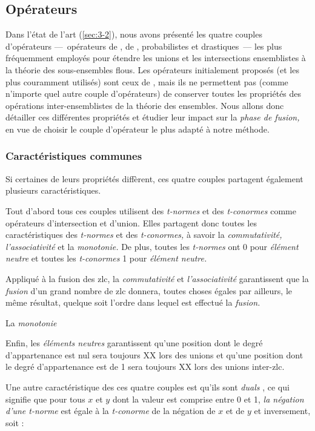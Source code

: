 \subsection{Opérateurs}

Dans l'état de l'art (\autoref{sec:3-2}), nous avons présenté les
quatre couples d'opérateurs ---~opérateurs de \textcite{Zadeh1965}, de
, probabilistes et drastiques~--- les plus
fréquemment employés pour étendre les unions et les intersections
ensemblistes à la théorie des sous-ensembles flous. Les opérateurs
initialement proposés (et les plus couramment utilisés) sont ceux de
\textcite{Zadeh1965}, mais ils ne permettent pas (comme n'importe quel
autre couple d'opérateurs) de conserver toutes les propriétés des
opérations inter-ensemblistes de la théorie des ensembles. Nous allons
donc détailler ces différentes propriétés et étudier leur impact sur
la \emph{phase de fusion,} en vue de choisir le couple d'opérateur le
plus adapté à notre méthode.

\subsubsection{Caractéristiques communes}

Si certaines de leurs propriétés diffèrent, ces quatre couples
partagent également plusieurs caractéristiques.

Tout d'abord tous ces couples utilisent des \emph{t-normes} et des
\emph{t-conormes} comme opérateurs d'intersection et d'union. Elles
partagent donc toutes les caractéristiques des \emph{t-normes} et des
\emph{t-conormes,} à savoir la \emph{commutativité,}
\emph{l'associativité} et la \emph{monotonie.} De plus, toutes les
\emph{t-normes} ont 0 pour \emph{élément neutre} et toutes les
\emph{t-conormes} 1 pour \emph{élément neutre.}

Appliqué à la fusion des \ac{zlc}, la \emph{commutativité} et
\emph{l'associativité} garantissent que la \emph{fusion} d'un grand
nombre de \ac{zlc} donnera, toutes choses égales par ailleurs, le même
résultat, quelque soit l'ordre dans lequel est effectué la
\emph{fusion.}

La \emph{monotonie}

Enfin, les \emph{éléments neutres} garantissent qu'une position dont
le degré d'appartenance est nul sera toujours XX lors des unions et
qu'une position dont le degré d’appartenance est de 1 sera toujours XX
lors des unions inter-\ac{zlc}.


Une autre caractéristique des ces quatre couples est qu'ils sont
\emph{duals} \autocite{Bouchon-Meunier2007}, ce qui signifie que pour
tous \(x\) et \(y\) dont la valeur est comprise entre 0 et 1, \emph{la
  négation d'une \emph{t-norme}} est égale à la \emph{t-conorme} de la
négation de \(x\) et de \(y\) et inversement, soit :

